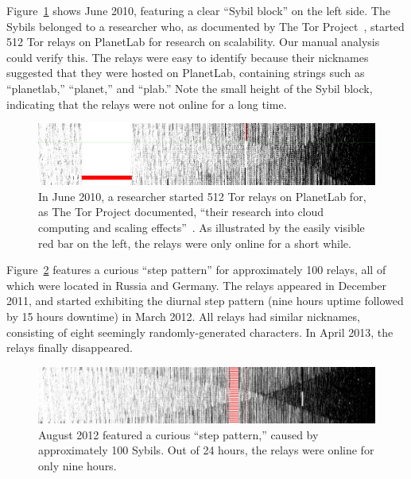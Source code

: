 Figure~\ref{fig:2010-06-planetlab} shows June 2010, featuring a clear ``Sybil
block'' on the left side.  The Sybils belonged to a researcher who, as
documented by The Tor Project~\cite{progressreport}, started 512 Tor relays on
PlanetLab for research on scalability.  Our manual analysis could verify this.
The relays were easy to identify because their nicknames suggested that they
were hosted on PlanetLab, containing strings such as ``planetlab,'' ``planet,''
and ``plab.''  Note the small height of the Sybil block, indicating that the
relays were not online for a long time.

\begin{figure}[t]
	\centering
	\includegraphics[width=\linewidth]{diagrams/planetlab-uptimes.jpg}
	\caption{In June 2010, a researcher started 512 Tor relays on PlanetLab for,
		as The Tor Project documented, ``their research into cloud computing and
		scaling effects''~\cite{progressreport}.  As illustrated by the easily
		visible red bar on the left, the relays were only online for a short
		while.}
	\label{fig:2010-06-planetlab}
\end{figure}

Figure~\ref{fig:2012-08-steppattern} features a curious ``step pattern'' for
approximately 100 relays, all of which were located in Russia and Germany.  The
relays appeared in December 2011, and started exhibiting the diurnal step
pattern (nine hours uptime followed by 15 hours downtime) in March 2012.  All
relays had similar nicknames, consisting of eight seemingly randomly-generated
characters.  In April 2013, the relays finally disappeared.

\begin{figure}[t]
	\centering
	\includegraphics[width=\linewidth]{diagrams/2012-08.jpg}
	\caption{August 2012 featured a curious ``step pattern,'' caused by
	approximately 100 Sybils.  Out of 24 hours, the relays were online for only
	nine hours.}
	\label{fig:2012-08-steppattern}
\end{figure}

